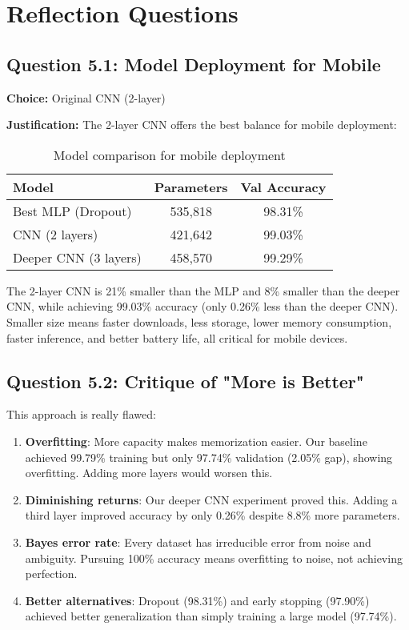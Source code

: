 \section{Reflection Questions}

\subsection{Question 5.1: Model Deployment for Mobile}

\textbf{Choice:} Original CNN (2-layer)

\textbf{Justification:} The 2-layer CNN offers the best balance for mobile deployment:

\begin{table}[h]
\centering
\begin{tabular}{|l|c|c|}
\hline
\textbf{Model} & \textbf{Parameters} & \textbf{Val Accuracy} \\ \hline
Best MLP (Dropout) & 535,818 & 98.31\% \\ \hline
CNN (2 layers) & 421,642 & 99.03\% \\ \hline
Deeper CNN (3 layers) & 458,570 & 99.29\% \\ \hline
\end{tabular}
\caption{Model comparison for mobile deployment}
\end{table}

The 2-layer CNN is 21\% smaller than the MLP and 8\% smaller than the deeper CNN, while achieving 99.03\% accuracy (only 0.26\% less than the deeper CNN). Smaller size means faster downloads, less storage, lower memory consumption, faster inference, and better battery life, all critical for mobile devices.

\subsection{Question 5.2: Critique of "More is Better"}

This approach is really flawed:

\begin{enumerate}
    \item \textbf{Overfitting}: More capacity makes memorization easier. Our baseline achieved 99.79\% training but only 97.74\% validation (2.05\% gap), showing overfitting. Adding more layers would worsen this.
    
    \item \textbf{Diminishing returns}: Our deeper CNN experiment proved this. Adding a third layer improved accuracy by only 0.26\% despite 8.8\% more parameters.
    
    \item \textbf{Bayes error rate}: Every dataset has irreducible error from noise and ambiguity. Pursuing 100\% accuracy means overfitting to noise, not achieving perfection.
    
    \item \textbf{Better alternatives}: Dropout (98.31\%) and early stopping (97.90\%) achieved better generalization than simply training a large model (97.74\%).
\end{enumerate}

